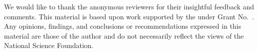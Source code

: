 \begin{acks}
  We would like to thank the anonymous reviewers for their insightful
  feedback and comments. This material is based upon work supported by
  the  under
  Grant No.~. Any opinions,
  findings, and conclusions or recommendations expressed in this
  material are those of the author and do not necessarily reflect the
  views of the \mbox{National} \mbox{Science} \mbox{Foundation}.
\end{acks}
